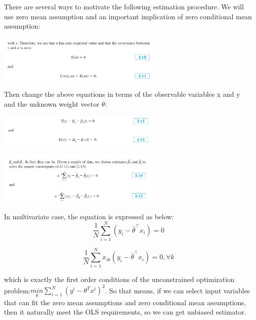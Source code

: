 \documentclass[a4paper,10pt]{article}
\newcommand{\tran}{^{\top}}
\begin{document}
There are several ways to motivate the following estimation procedure. We will use zero mean assumption and an important implication of zero conditional mean assumption: \\

\begin{center}

    \includegraphics[width=8cm]{6.png}
\end{center}

Then change the above equations in terms of the observable variables x and y and the unknown weight vector $\theta$:\\

\begin{center}

    \includegraphics[width=8cm]{7.png}
\end{center}


\begin{center}

    \includegraphics[width=8cm]{8.png}
\end{center}

In multivariate case, the equation is expressed as below:\\

\begin{equation}
    \frac{1}{N} \sum_{i=1}^{N} (y_{i}-\bar{\theta}\tran x_{i})=0
\end{equation}    
   
   
   
\begin{equation}
    \frac{1}{N} \sum_{i=1}^{N} x_{ik}(y_{i}-\bar{\theta}\tran x_{i})=0 , \forall k
\end{equation} 


which is exactly the first order conditions of the unconstrained optimization problem:$\underset{\theta}{min} \sum_{i=1}^{N} (y^{i}-\theta^{T}x^{i})^2$. So that means, if we can select input variables that can fit the zero mean assumptions and zero conditional mean assumptions, then it naturally meet the OLS requirements, so we can get unbiased estimator.\\
\end{document}
